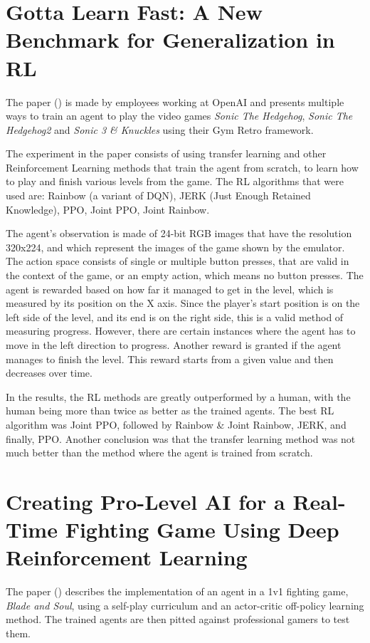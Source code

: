 \section{Gotta Learn Fast: A New Benchmark for Generalization in RL}
The paper (\cite{nichol2018gottalearnfast}) is made by employees working at OpenAI and presents multiple ways to train an agent to play the video games \emph{Sonic The Hedgehog}\texttrademark, \emph{Sonic The Hedgehog}\texttrademark\emph{2} and \emph{Sonic 3 \& Knuckles} using their Gym Retro framework. 

The experiment in the paper consists of using transfer learning and other Reinforcement Learning methods that train the agent from scratch, to learn how to play and finish various levels from the game. The RL algorithms that were used are: Rainbow (a variant of DQN), JERK (Just Enough Retained Knowledge), PPO, Joint PPO, Joint Rainbow.

The agent's observation is made of 24-bit RGB images that have the resolution 320x224, and which represent the images of the game shown by the emulator. The action space consists of single or multiple button presses, that are valid in the context of the game, or an empty action, which means no button presses. The agent is rewarded based on how far it managed to get in the level, which is measured by its position on the X axis. Since the player's start position is on the left side of the level, and its end is on the right side, this is a valid method of measuring progress. However, there are certain instances where the agent has to move in the left direction to progress. Another reward is granted if the agent manages to finish the level. This reward starts from a given value and then decreases over time.

In the results, the RL methods are greatly outperformed by a human, with the human being more than twice as better as the trained agents. The best RL algorithm was Joint PPO, followed by Rainbow \& Joint Rainbow, JERK, and finally, PPO. Another conclusion was that the transfer learning method was not much better than the method where the agent is trained from scratch.



\section{Creating Pro-Level AI for a Real-Time Fighting Game Using Deep Reinforcement Learning}
The paper (\cite{oh2020creatingprolevelaiforfightinggame}) describes the implementation of an agent in a 1v1 fighting game, \emph{Blade and Soul}, using a self-play curriculum and an actor-critic off-policy learning method. The trained agents are then pitted against professional gamers to test them.

